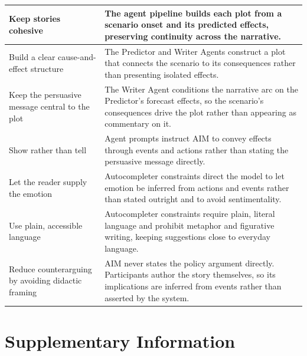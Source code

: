 \documentclass[11pt]{article}
\begin{document}
\begin{longtable}{@{}p{}p{}@{}}
\raggedright\arraybackslash Keep stories cohesive &
\raggedright\arraybackslash The agent pipeline builds each plot from a scenario onset and its predicted effects, preserving continuity across the narrative. \\
\midrule

\raggedright\arraybackslash Build a clear cause-and-effect structure &
\raggedright\arraybackslash The Predictor and Writer Agents construct a plot that connects the scenario to its consequences rather than presenting isolated effects. \\
\midrule

\raggedright\arraybackslash Keep the persuasive message central to the plot &
\raggedright\arraybackslash The Writer Agent conditions the narrative arc on the Predictor's forecast effects, so the scenario's consequences drive the plot rather than appearing as commentary on it. \\
\midrule

\raggedright\arraybackslash Show rather than tell &
\raggedright\arraybackslash Agent prompts instruct AIM to convey effects through events and actions rather than stating the persuasive message directly. \\
\midrule

\raggedright\arraybackslash Let the reader supply the emotion &
\raggedright\arraybackslash Autocompleter constraints direct the model to let emotion be inferred from actions and events rather than stated outright and to avoid sentimentality. \\
\midrule

\raggedright\arraybackslash Use plain, accessible language &
\raggedright\arraybackslash Autocompleter constraints require plain, literal language and prohibit metaphor and figurative writing, keeping suggestions close to everyday language. \\
\midrule

\raggedright\arraybackslash Reduce counterarguing by avoiding didactic framing &
\raggedright\arraybackslash AIM never states the policy argument directly. Participants author the story themselves, so its implications are inferred from events rather than asserted by the system. \\

\end{longtable}


\clearpage


\section{Supplementary Information}
\label{sec:supplementary}
\setcounter{table}{0}
\renewcommand{\thetable}{S\arabic{table}}
\renewcommand{\theHtable}{SI.\arabic{table}}
\captionsetup[table]{name=Supplementary Table}
\setcounter{figure}{0}
\renewcommand{\thefigure}{S\arabic{figure}}
\renewcommand{\theHfigure}{SI.\arabic{figure}}
\captionsetup[figure]{name=Supplementary Fig.}
\end{document}
